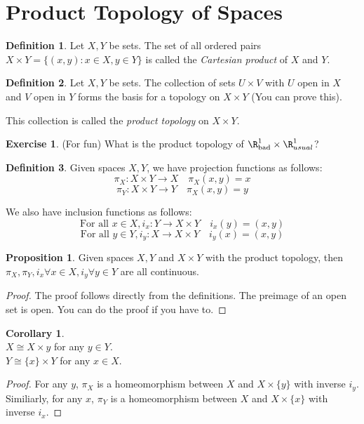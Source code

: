 \documentclass[a5paper]{article}
\theoremstyle{definition}%
\newtheorem{corollary}[theorem]{Corollary}
\newtheorem{proposition}[theorem]{Proposition}
\newtheorem*{definition*}{Definition}
\newtheorem{exercise}{Exercise}
\numberwithin{exercise}{section}
\theoremstyle{remark}%
\begin{document}
\section{Product Topology of Spaces}

\begin{definition*}
Let $X,Y$ be sets. The set of all ordered pairs $X\times Y = \{(x,y):x\in X,y\in Y\}$ is called the \emph{Cartesian product} of $X$ and $Y$. 
\end{definition*}

\begin{highlight}
\begin{definition*}
Let $X,Y$ be sets. The collection of sets $U\times V$ with $U$ open in $X$ and $V$ open in $Y$ forms the basis for a topology on $X\times Y$ (You can prove this). 

This collection is called the \emph{product topology} on $X\times Y$. 
\end{definition*}
\end{highlight}

\begin{exercise}
(For fun) What is the product topology of $\R^1_\text{bad}\times\R^1_{usual}$?
\end{exercise}

\begin{definition*}
Given spaces $X,Y$, we have projection functions as follows:
$$\pi_X:X\times Y \to X \quad \pi_X(x,y)=x$$
$$\pi_Y:X\times Y \to Y \quad \pi_X(x,y)=y$$

We also have inclusion functions as follows:
$$ \text{For all } x\in X, i_x:Y\to X\times Y \quad i_x(y)=(x,y)$$
$$ \text{For all } y\in Y, i_y:X\to X\times Y \quad i_y(x)=(x,y)$$
\end{definition*}

\begin{proposition}
Given spaces $X,Y$ and $X\times Y$ with the product topology, then $\pi_X, \pi_Y, i_x \forall x\in X, i_y \forall y\in Y$ are all continuous. 
\end{proposition}
\begin{proof}
The proof follows directly from the definitions. The preimage of an open set is open. You can do the proof if you have to. 
\end{proof}

\begin{corollary}\mbox{}\\
$X\cong X\times {y}$ for any $y\in Y$. \\
$Y\cong \{x\}\times Y$ for any $x\in X$. 
\end{corollary}
\begin{proof}
For any $y$, $\pi_X$ is a homeomorphism between $X$ and $X\times\{y\}$ with inverse $i_y$. Similiarly, for any $x$, $\pi_Y$ is a homeomorphism between $X$ and $X\times\{x\}$ with inverse $i_x$. 
\end{proof}
\end{document}

